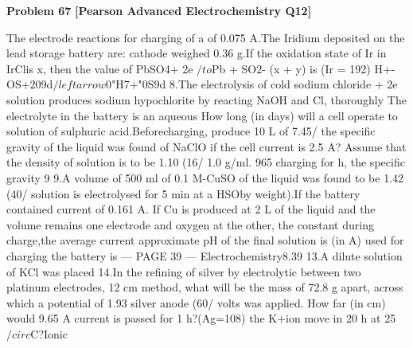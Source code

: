 \begin{problembox}
\textbf{Problem 67} \hfill \textbf{[Pearson Advanced Electrochemistry Q12]}
\label{q:ext-pearson-67}

The electrode reactions for charging of a
of 0.075 A.The Iridium deposited on the
lead storage battery are:
cathode weighed 0.36 g.If the oxidation
state of Ir in IrClis x, then the value of
PbSO4+ 2e $/to$Pb + SO$2$-
(x + y) is (Ir = 192)
H+-OS+$2$09d$/leftarrow$0"H7+"0S9d
8.The electrolysis of cold sodium chloride
+ 2e
solution produces sodium hypochlorite
by reacting NaOH and Cl, thoroughly
The electrolyte in the battery is an aqueous
How long (in days) will a cell operate to
solution of sulphuric acid.Beforecharging,
produce 10 L of 7.45/%
the specific gravity of the liquid was found
of NaClO if the cell current is 2.5 A?
Assume that the density of solution is
to be 1.10 (16/%
1.0 g/ml.
965
charging for
h, the specific gravity
9
9.A volume of 500 ml of 0.1 M-CuSO
of the liquid was found to be 1.42 (40/%
solution is electrolysed for 5 min at a
HSOby weight).If the battery contained
current of 0.161 A. If Cu is produced at
2 L of the liquid and the volume remains
one electrode and oxygen at the other, the
constant during charge,the average current
approximate pH of the final solution is
(in A) used for charging the battery is
--- PAGE 39 ---
Electrochemistry8.39
13.A dilute solution of KCl was placed
14.In the refining of silver by electrolytic
between two platinum electrodes, 12 cm
method, what will be the mass of 72.8 g
apart, across which a potential of 1.93
silver anode (60/%
volts was applied. How far (in cm) would
9.65 A current is passed for 1 h?(Ag=108)
the K+ion move in 20 h at 25$/circ$C?Ionic
\end{problembox}

